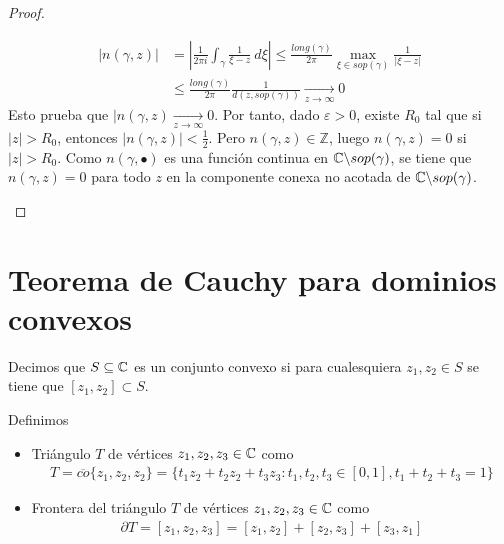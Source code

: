 \begin{proof}
\begin{enumerate}
              \begin{align*}
                  |n(\gamma,z)| & = \left| \frac{1}{2\pi i} \int_{\gamma}{\frac{1}{\xi - z} \ d\xi} \right| \leq \frac{long(\gamma)}{2\pi} \max_{\xi \in sop(\gamma)}\frac{1}{|\xi - z|} \\
                                & \leq \frac{long(\gamma)}{2\pi} \frac{1}{d(z,sop(\gamma))} \xrightarrow[z \to \infty]{} 0
              \end{align*}
              Esto prueba que $|n(\gamma,z) \xrightarrow[z \to \infty]{} 0$. Por tanto, dado $\varepsilon > 0$, existe $R_0$ tal que si $|z| > R_0$, entonces $|n(\gamma,z)| < \frac{1}{2}$. Pero $n(\gamma,z) \in \mathbb{Z}$, luego $n(\gamma,z) = 0$ si $|z| > R_0$. Como  $n(\gamma, \bullet)$ es una función continua en $\mathbb{C} \backslash sop(\gamma)$, se tiene que $n(\gamma,z) = 0$ para todo $z$ en la componente conexa no acotada de $\mathbb{C} \backslash sop(\gamma)$.
    \end{enumerate}
\end{proof}

\section{Teorema de Cauchy para dominios convexos}

\begin{defi}
    Decimos que $S \subseteq \mathbb{C}$ es un conjunto convexo si para cualesquiera $z_1,z_2 \in S$ se tiene que $[z_1,z_2] \subset S$.
\end{defi}

\begin{defi}
    Definimos
    \begin{itemize}
        \item Triángulo $T$ de vértices $z_1,z_2,z_3 \in \mathbb{C}$ como
              \begin{align*}
                  T = \overline{co}\{z_1,z_2,z_2\} = \{ t_1z_2 + t_2z_2 + t_3z_3 : t_1,t_2,t_3 \in [0,1], t_1 + t_2 + t_3 = 1\}
              \end{align*}
        \item Frontera del triángulo $T$ de vértices $z_1,z_2,z_3 \in \mathbb{C}$ como
              \begin{align*}
                  \partial T = [z_1,z_2,z_3] = [z_1,z_2] + [z_2,z_3] + [z_3,z_1]
              \end{align*}
    \end{itemize}
\end{defi}

